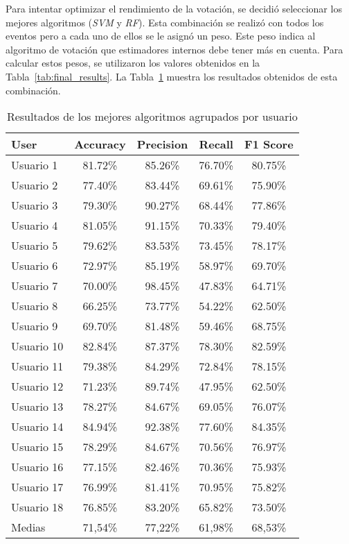 Para intentar optimizar el rendimiento de la votación, se decidió seleccionar los mejores algoritmos (\textit{SVM} y \textit{RF}). Esta combinación se realizó con todos los eventos pero a cada uno de ellos se le asignó un peso. Este peso indica al algoritmo de votación que estimadores internos debe tener más en cuenta. Para calcular estos pesos, se utilizaron los valores obtenidos en la Tabla~\ref{tab:final_results}. La Tabla~\ref{tab:combine_selected_alg} muestra los resultados obtenidos de esta combinación.


\begin{table}[!h]
    \centering
    \begin{tabular}{l c c c c}
\toprule
User & Accuracy & Precision &  Recall & F1 Score\\
\midrule

Usuario 1      &   81.72\% &    85.26\% &  76.70\% &   80.75\%  \\
Usuario 2      &   77.40\% &    83.44\% &  69.61\% &   75.90\%  \\
Usuario 3      &   79.30\% &    90.27\% &  68.44\% &   77.86\%  \\
Usuario 4      &   81.05\% &    91.15\% &  70.33\% &   79.40\%  \\
Usuario 5      &   79.62\% &    83.53\% &  73.45\% &   78.17\%  \\
Usuario 6      &   72.97\% &    85.19\% &  58.97\% &   69.70\%  \\
Usuario 7      &   70.00\% &   98.45\% &  47.83\% &   64.71\%  \\
Usuario 8      &   66.25\% &    73.77\% &  54.22\% &   62.50\%  \\
Usuario 9      &   69.70\% &    81.48\% &  59.46\% &   68.75\%  \\
Usuario 10   &   82.84\% &    87.37\% &  78.30\% &   82.59\%   \\
Usuario 11   &   79.38\% &    84.29\% &  72.84\% &   78.15\%   \\
Usuario 12   &   71.23\% &    89.74\% &  47.95\% &   62.50\%   \\
Usuario 13   &   78.27\% &    84.67\% &  69.05\% &   76.07\%   \\
Usuario 14   &   84.94\% &    92.38\% &  77.60\% &   84.35\%  \\
Usuario 15   &   78.29\% &    84.67\% &  70.56\% &   76.97\%   \\
Usuario 16 &   77.15\% &    82.46\% &  70.36\% &   75.93\%  \\
Usuario 17 &   76.99\% &    81.41\% &  70.95\% &   75.82\%  \\
Usuario 18 &   76.85\% &    83.20\% &  65.82\% &   73.50\%  \\
\midrule
Medias & 71,54\% & 	77,22\% &	61,98\% &	68,53\% \\

\bottomrule
\end{tabular}
    \caption{Resultados de los mejores algoritmos agrupados por usuario}
    \label{tab:combine_selected_alg}
\end{table}

